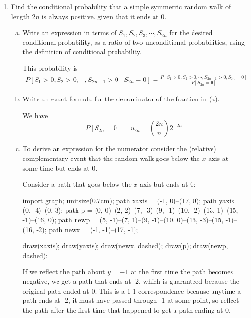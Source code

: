 \documentclass{article}
\begin{document}
\begin{enumerate}[(1)]
\begin{enumerate}[(a)]
		\end{enumerate}

	\item Find the conditional probability that a simple symmetric random walk of length $2n$ is always positive, given that it ends at 0.

		\begin{enumerate}[(a)]
			\item Write an expression in terms of $S_1, S_2, S_3, \cdots, S_{2n}$ for the desired conditional probability, as a ratio of two unconditional probabilities, using the definition of conditional probability.
				\begin{soln}
					This probability is
					\begin{align*}
						P[S_1>0, S_2>0, \cdots, S_{2n-1}>0\mid S_{2n}=0] = \frac{P[S_1>0, S_2>0, \cdots, S_{2n-1}>0, S_{2n}=0]}{P[S_{2n}=0]}
					\end{align*}
				\end{soln}

			\item Write an exact formula for the denominator of the fraction in (a).
				\begin{soln}
					We have
					\[P[S_{2n}=0]=u_{2n}=\binom{2n}{n}2^{-2n}\]
				\end{soln}

			\item To derive an expression for the numerator consider the (relative) complementary event that the random walk goes below the $x$-axis at some time but ends at 0.
				\begin{soln}
					Consider a path that goes below the $x$-axis but ends at 0:
					\begin{center}
						\begin{asy}
							import graph;
							unitsize(0.7cm);
							path xaxis = (-1, 0)--(17, 0);
							path yaxis = (0, -4)--(0, 3);
							path p = (0, 0)--(2, 2)--(7, -3)--(9, -1)--(10, -2)--(13, 1)--(15, -1)--(16, 0);
							path newp = (5, -1)--(7, 1)--(9, -1)--(10, 0)--(13, -3)--(15, -1)--(16, -2);
							path newx = (-1, -1)--(17, -1);

							draw(xaxis);
							draw(yaxis);
							draw(newx, dashed);
							draw(p);
							draw(newp, dashed);
						\end{asy}
					\end{center}
					If we reflect the path about $y=-1$ at the first time the path becomes negative, we get a path that ends at -2, which is guaranteed because the original path ended at 0. This is a 1-1 correspondence because anytime a path ends at -2, it must have passed through -1 at some point, so reflect the path after the first time that happened to get a path ending at 0.
				\end{soln}


\end{enumerate}
\end{enumerate}
\end{document}
